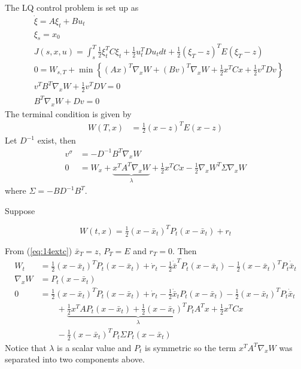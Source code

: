 \begin{example}%
\label{ex:14lq}
The LQ control problem is set up as
\begin{align*}
&\dot{\xi} = A\xi_t+Bu_t \\
&\xi_s = x_0 \\
&J(s,x,u) = \int_s^T \tfrac{1}{2}\xi_t^T C\xi_t + \tfrac{1}{2}u_t^T Du_t dt + \tfrac{1}{2}{(\xi_T-z)}^T E(\xi_T-z) \\
&0 = W_{s,T} + \min\left\lbrace {(Ax)}^T\nabla_x W + {(Bv)}^T \nabla_x W + \tfrac{1}{2}x^T Cx + \tfrac{1}{2}v^T Dv \right\rbrace \\
&v^T B^T \nabla_x W + \frac{1}{2}v^T DV = 0 \\
&B^T \nabla_x W + Dv = 0
\end{align*}
The terminal condition is given by
\begin{align}
\label{eq:14extc}
W(T,x) &= \tfrac{1}{2}{(x-z)}^T E(x-z)
\end{align}
Let $D^{-1}$ exist, then
\begin{align*}
v^\sigma &= -D^{-1}B^T \nabla_x W \\
0 &= W_x+\underbrace{x^T A^T \nabla_x W}_{\lambda} + \tfrac{1}{2}x^T Cx - \tfrac{1}{2}\nabla_x W^T \Sigma\nabla_x W
\end{align*}
where $\Sigma = -BD^{-1}B^T$.

Suppose

\begin{equation*}
W(t,x) = \tfrac{1}{2}{(x-\bar{x}_t)}^T P_t(x-\bar{x}_t) + r_t
\end{equation*}

From (\ref{eq:14extc}) $\bar{x}_T = z$, $P_T=E$ and $r_T=0$.
Then
\begin{align*}
W_t &= \tfrac{1}{2}{(x-\bar{x}_t)}^T\dot{P}_t(x-\bar{x}_t)+\dot{r}_t - \tfrac{1}{2}\dot{\bar{x}}^T P_t(x-\bar{x}_t) - \tfrac{1}{2}{(x-\bar{x}_t)}^T P_t\dot{\bar{x}}_t \\
\nabla_x W &= P_t(x-\bar{x}_t) \\
0 &= \tfrac{1}{2}{(x-\bar{x}_t)}^T\dot{P}_t(x-\bar{x}_t) + \dot{r}_t - \tfrac{1}{2}\dot{\bar{x}}_t P_t(x-\bar{x}_t) - \tfrac{1}{2}{(x-\bar{x}_t)}^T P_t\dot{\bar{x}}_t \\
&\qquad + \underbrace{\tfrac{1}{2}x^T AP_t(x-\bar{x}_t) + \tfrac{1}{2}{(x-\bar{x}_t)}^T P_t A^T x}_{\lambda} + \tfrac{1}{2}x^T Cx \\
&\qquad - \tfrac{1}{2}{(x-\bar{x}_t)}^T P_t \Sigma P_t(x-\bar{x}_t)
\end{align*}
Notice that $\lambda$ is a scalar value and $P_t$ is symmetric so the term $x^T A^T \nabla_x W$ was separated into two components above.


\end{example}
